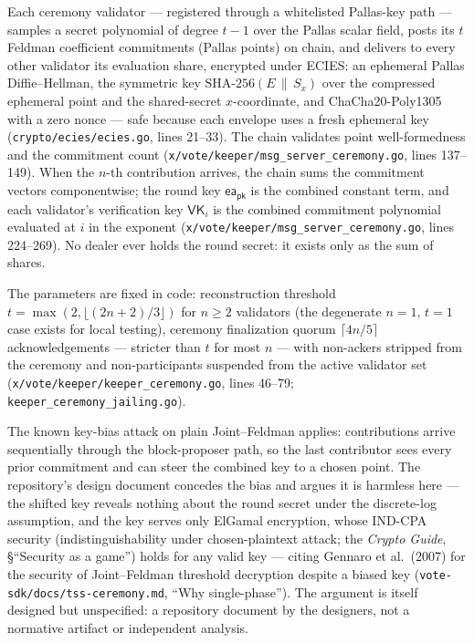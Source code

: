 \documentclass[11pt,a4paper]{article}
\theoremstyle{definition}
\begin{document}
Each ceremony validator --- registered through a whitelisted Pallas-key
path --- samples a secret polynomial of degree $t - 1$ over the Pallas
scalar field, posts its $t$ Feldman coefficient commitments (Pallas points)
on chain, and delivers to every other validator its evaluation share,
encrypted under ECIES: an ephemeral Pallas Diffie--Hellman, the symmetric
key $\mathrm{SHA\text{-}256}(E \,\|\, S_x)$ over the compressed ephemeral
point and the shared-secret $x$-coordinate, and ChaCha20-Poly1305 with a
zero nonce --- safe because each envelope uses a fresh ephemeral key
(\texttt{crypto/ecies/ecies.go}, lines 21--33). The chain validates point
well-formedness and the commitment count
(\texttt{x/vote/keeper/msg\_server\_ceremony.go}, lines 137--149). When the
$n$-th contribution arrives, the chain sums the commitment vectors
componentwise; the round key $\mathsf{ea_{pk}}$ is the combined constant
term, and each validator's verification key $\mathsf{VK}_i$ is the combined
commitment polynomial evaluated at $i$ in the exponent
(\texttt{x/vote/keeper/msg\_server\_ceremony.go}, lines 224--269). No dealer
ever holds the round secret: it exists only as the sum of shares.

The parameters are fixed in code: reconstruction threshold
$t = \max(2, \lfloor (2n+2)/3 \rfloor)$ for $n \geq 2$ validators (the
degenerate $n = 1$, $t = 1$ case exists for local testing), ceremony
finalization quorum $\lceil 4n/5 \rceil$ acknowledgements --- stricter than
$t$ for most $n$ --- with non-ackers stripped from the ceremony and
non-participants suspended from the active validator set
(\texttt{x/vote/keeper/keeper\_ceremony.go}, lines 46--79;
\texttt{keeper\_ceremony\_jailing.go}).

The known key-bias attack on plain Joint--Feldman applies: contributions
arrive sequentially through the block-proposer path, so the last
contributor sees every prior commitment and can steer the combined key to
a chosen point. The repository's design document concedes the bias and
argues it is harmless here --- the shifted key reveals nothing about the
round secret under the discrete-log assumption, and the key serves only
ElGamal encryption, whose IND-CPA security (indistinguishability under
chosen-plaintext attack; the \emph{Crypto Guide}, \S``Security as a
game'') holds for any valid key ---
citing Gennaro et al.\ (2007) for the security of Joint--Feldman threshold
decryption despite a biased key (\texttt{vote-sdk/docs/tss-ceremony.md},
``Why single-phase''). The argument is itself designed but unspecified: a
repository document by the designers, not a normative artifact or
independent analysis.
\end{document}

